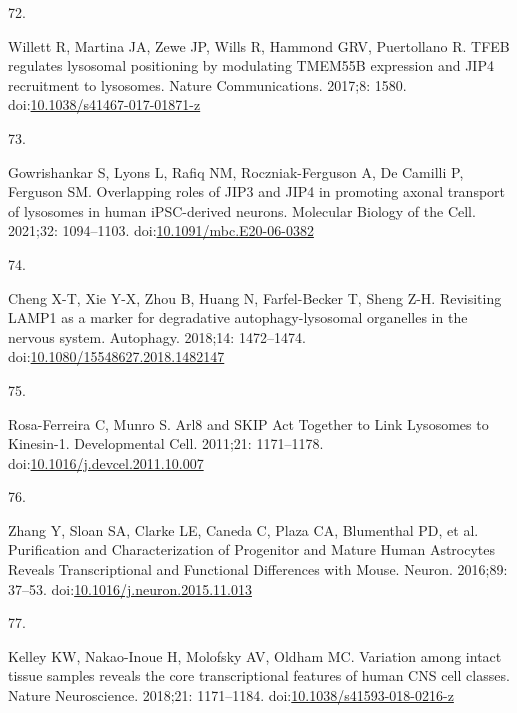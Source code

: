 \documentclass[
  12pt,
  a4paper,
]{book}
\newlength{\cslhangindent}
\newlength{\csllabelwidth}
\newlength{\cslentryspacingunit} %
\newenvironment{CSLReferences}[2] %
 {%
  \setlength{\parindent}{0pt}
  \ifodd #1
  \let\oldpar\par
  \def\par{\hangindent=\cslhangindent\oldpar}
  \fi
  \setlength{\parskip}{#2\cslentryspacingunit}
 }%
 {}
\newcommand{\CSLLeftMargin}[1]{\parbox[t]{\csllabelwidth}{#1}}
\newcommand{\CSLRightInline}[1]{\parbox[t]{\linewidth - \csllabelwidth}{#1}\break}
\begin{document}
\begin{CSLReferences}{0}{0}
\leavevmode{}%
\CSLLeftMargin{72. }%
\CSLRightInline{Willett R, Martina JA, Zewe JP, Wills R, Hammond GRV, Puertollano R. {TFEB} regulates lysosomal positioning by modulating {TMEM55B} expression and {JIP4} recruitment to lysosomes. Nature Communications. 2017;8: 1580. doi:\href{https://doi.org/10.1038/s41467-017-01871-z}{10.1038/s41467-017-01871-z}}

\leavevmode{}%
\CSLLeftMargin{73. }%
\CSLRightInline{Gowrishankar S, Lyons L, Rafiq NM, Roczniak-Ferguson A, De Camilli P, Ferguson SM. Overlapping roles of {JIP3} and {JIP4} in promoting axonal transport of lysosomes in human {iPSC-derived} neurons. Molecular Biology of the Cell. 2021;32: 1094--1103. doi:\href{https://doi.org/10.1091/mbc.E20-06-0382}{10.1091/mbc.E20-06-0382}}

\leavevmode{}%
\CSLLeftMargin{74. }%
\CSLRightInline{Cheng X-T, Xie Y-X, Zhou B, Huang N, Farfel-Becker T, Sheng Z-H. Revisiting {LAMP1} as a marker for degradative autophagy-lysosomal organelles in the nervous system. Autophagy. 2018;14: 1472--1474. doi:\href{https://doi.org/10.1080/15548627.2018.1482147}{10.1080/15548627.2018.1482147}}

\leavevmode{}%
\CSLLeftMargin{75. }%
\CSLRightInline{Rosa-Ferreira C, Munro S. Arl8 and {SKIP Act Together} to {Link Lysosomes} to {Kinesin-1}. Developmental Cell. 2011;21: 1171--1178. doi:\href{https://doi.org/10.1016/j.devcel.2011.10.007}{10.1016/j.devcel.2011.10.007}}

\leavevmode{}%
\CSLLeftMargin{76. }%
\CSLRightInline{Zhang Y, Sloan SA, Clarke LE, Caneda C, Plaza CA, Blumenthal PD, et al. Purification and {Characterization} of {Progenitor} and {Mature Human Astrocytes Reveals Transcriptional} and {Functional Differences} with {Mouse}. Neuron. 2016;89: 37--53. doi:\href{https://doi.org/10.1016/j.neuron.2015.11.013}{10.1016/j.neuron.2015.11.013}}

\leavevmode{}%
\CSLLeftMargin{77. }%
\CSLRightInline{Kelley KW, Nakao-Inoue H, Molofsky AV, Oldham MC. Variation among intact tissue samples reveals the core transcriptional features of human {CNS} cell classes. Nature Neuroscience. 2018;21: 1171--1184. doi:\href{https://doi.org/10.1038/s41593-018-0216-z}{10.1038/s41593-018-0216-z}}


\end{CSLReferences}
\end{document}
